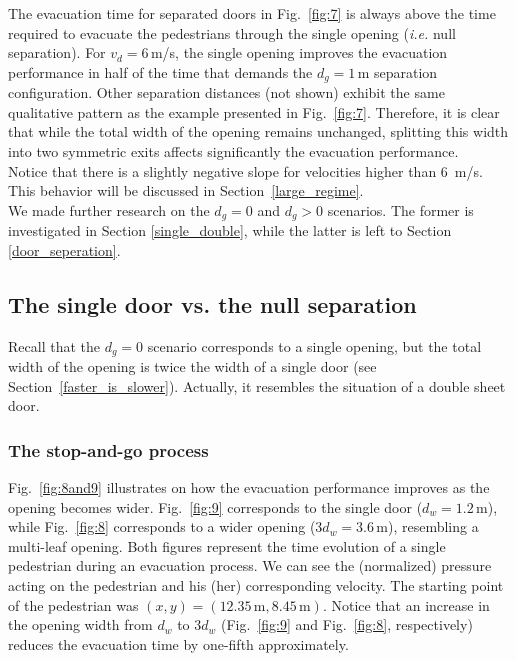 The evacuation time for separated doors in Fig.~\ref{fig:7} is always above the 
time required to evacuate the pedestrians through the single opening 
(\emph{i.e.} null separation). For $v_d=6\,$m/s, the single opening improves 
the evacuation performance in half of the time that demands the $d_g=1\,$m 
separation configuration. Other separation distances (not shown) exhibit the 
same qualitative pattern as the example presented in Fig.~\ref{fig:7}. 
Therefore, it is clear that while the total width of the opening 
remains unchanged, splitting this width into two symmetric exits affects 
significantly the evacuation performance. \\

{\color{red} Notice that there is a slightly negative slope for velocities higher than 6~m/s. This behavior will be discussed in Section~\ref{large_regime}. }\\

We made further research on the $d_g=0$ and $d_g>0$ scenarios. The 
former is investigated in Section \ref{single_double}, while the latter is left 
to Section \ref{door_seperation}. \\

\subsection{\label{single_double}The single door vs. the null separation}

Recall that the $d_g=0$ scenario corresponds to a single opening, but the total 
width of the opening is twice the width of a single door (see 
Section~\ref{faster_is_slower}). Actually, it resembles the situation of a 
double sheet door.  \\

\subsubsection{\label{null_gap_data}The stop-and-go process}

Fig.~\ref{fig:8and9} illustrates on how the evacuation performance improves as 
the opening becomes wider.  Fig.~\ref{fig:9} corresponds to the single door 
($d_w=1.2\,$m), while  Fig.~\ref{fig:8} corresponds to a wider opening 
($3d_w=3.6\,$m), resembling a multi-leaf opening. Both figures represent 
the time evolution of a single pedestrian during an evacuation process. We can 
see the (normalized) pressure acting on the pedestrian and his (her) 
corresponding velocity. The starting point of the pedestrian was 
$(x,y)=(12.35\,\mathrm{m},8.45\,\mathrm{m})$. Notice that an increase in the 
opening width from $d_w$ to $3d_w$ (Fig.~\ref{fig:9} and Fig.~\ref{fig:8}, 
respectively) reduces the evacuation time by one-fifth approximately. \\

